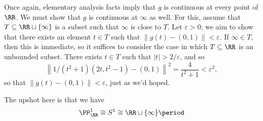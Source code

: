 \begin{exm}
	Once again, elementary analysis facts imply that $g$ is continuous at every point of $\RR$.
	We must show that $g$ is continuous at $\infty$ as well.
	For this, assume that $T \subseteq \RR \sqcup \{\infty\}$ is a subset such that $\infty$ is close to $T$.
	Let $\varepsilon >0$;
	we aim to show that there exists an element $t\in T$ such that $\|g(t)-(0,1)\| < \varepsilon $.
	If $\infty \in T$, then this is immediate, so it suffices to consider the case in which $T \subseteq \RR$ is an unbounded subset.
	There exists $t \in T$ such that $|t| > 2/\varepsilon$, and so
	\[
		\left\|1/(t^2+1)(2t, t^2-1) - (0,1)\right\|^2 = \frac{4}{t^2+1} < \varepsilon^2 \comma
	\]
	so that $ \| g(t) - (0,1) \| < \varepsilon $, just as we'd hoped.
	
	The upshot here is that we have
	\[
		\PP^1_{\RR} \cong S^1 \cong \RR \sqcup \{\infty\} \period
	\]
\end{exm}


